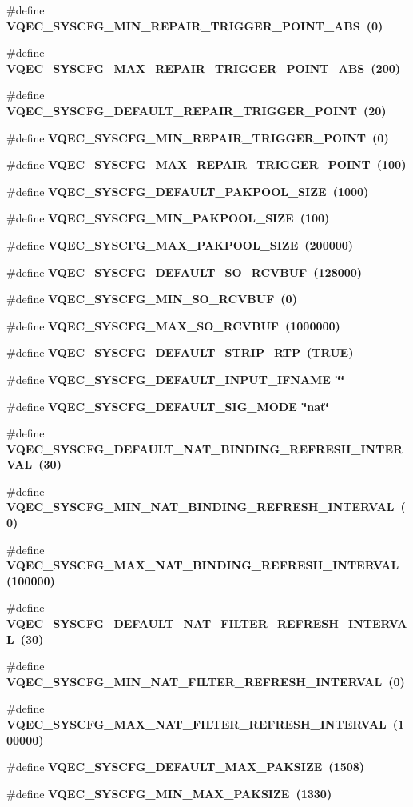 \begin{CompactItemize}
\#define \bf{VQEC\_\-SYSCFG\_\-MIN\_\-REPAIR\_\-TRIGGER\_\-POINT\_\-ABS}~(0)
\item 
\#define \bf{VQEC\_\-SYSCFG\_\-MAX\_\-REPAIR\_\-TRIGGER\_\-POINT\_\-ABS}~(200)
\item 
\#define \bf{VQEC\_\-SYSCFG\_\-DEFAULT\_\-REPAIR\_\-TRIGGER\_\-POINT}~(20)
\item 
\#define \bf{VQEC\_\-SYSCFG\_\-MIN\_\-REPAIR\_\-TRIGGER\_\-POINT}~(0)
\item 
\#define \bf{VQEC\_\-SYSCFG\_\-MAX\_\-REPAIR\_\-TRIGGER\_\-POINT}~(100)
\item 
\#define \bf{VQEC\_\-SYSCFG\_\-DEFAULT\_\-PAKPOOL\_\-SIZE}~(1000)
\item 
\#define \bf{VQEC\_\-SYSCFG\_\-MIN\_\-PAKPOOL\_\-SIZE}~(100)
\item 
\#define \bf{VQEC\_\-SYSCFG\_\-MAX\_\-PAKPOOL\_\-SIZE}~(200000)
\item 
\#define \bf{VQEC\_\-SYSCFG\_\-DEFAULT\_\-SO\_\-RCVBUF}~(128000)
\item 
\#define \bf{VQEC\_\-SYSCFG\_\-MIN\_\-SO\_\-RCVBUF}~(0)
\item 
\#define \bf{VQEC\_\-SYSCFG\_\-MAX\_\-SO\_\-RCVBUF}~(1000000)
\item 
\#define \bf{VQEC\_\-SYSCFG\_\-DEFAULT\_\-STRIP\_\-RTP}~(\bf{TRUE})
\item 
\#define \bf{VQEC\_\-SYSCFG\_\-DEFAULT\_\-INPUT\_\-IFNAME}~\char`\"{}\char`\"{}
\item 
\#define \bf{VQEC\_\-SYSCFG\_\-DEFAULT\_\-SIG\_\-MODE}~\char`\"{}nat\char`\"{}
\item 
\#define \bf{VQEC\_\-SYSCFG\_\-DEFAULT\_\-NAT\_\-BINDING\_\-REFRESH\_\-INTERVAL}~(30)
\item 
\#define \bf{VQEC\_\-SYSCFG\_\-MIN\_\-NAT\_\-BINDING\_\-REFRESH\_\-INTERVAL}~(0)
\item 
\#define \bf{VQEC\_\-SYSCFG\_\-MAX\_\-NAT\_\-BINDING\_\-REFRESH\_\-INTERVAL}~(100000)
\item 
\#define \bf{VQEC\_\-SYSCFG\_\-DEFAULT\_\-NAT\_\-FILTER\_\-REFRESH\_\-INTERVAL}~(30)
\item 
\#define \bf{VQEC\_\-SYSCFG\_\-MIN\_\-NAT\_\-FILTER\_\-REFRESH\_\-INTERVAL}~(0)
\item 
\#define \bf{VQEC\_\-SYSCFG\_\-MAX\_\-NAT\_\-FILTER\_\-REFRESH\_\-INTERVAL}~(100000)
\item 
\#define \bf{VQEC\_\-SYSCFG\_\-DEFAULT\_\-MAX\_\-PAKSIZE}~(1508)
\item 
\#define \bf{VQEC\_\-SYSCFG\_\-MIN\_\-MAX\_\-PAKSIZE}~(1330)
\item 

\end{CompactItemize}
